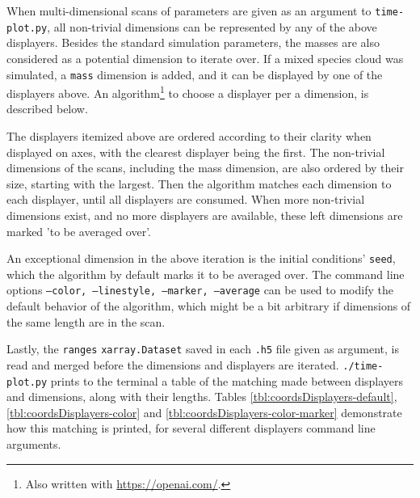 When multi-dimensional scans of parameters are given as an argument to \texttt{time-plot.py}, all non-trivial dimensions can be represented by any of the above displayers. Besides the standard simulation parameters, the masses are also considered as a potential dimension to iterate over. If a mixed species cloud was simulated, a \texttt{mass} dimension is added, and it can be displayed by one of the displayers above. An algorithm\footnote{Also written with \url{https://openai.com/}.} to choose a displayer per a dimension, is described below.

The displayers itemized above are ordered according to their clarity when displayed on axes, with the clearest displayer being the first. The non-trivial dimensions of the scans, including the mass dimension, are also ordered by their size, starting with the largest. Then the algorithm matches each dimension to each displayer, until all displayers are consumed. When more non-trivial dimensions exist, and no more displayers are available, these left dimensions are marked 'to be averaged over'.

An exceptional dimension in the above iteration is the initial conditions' \texttt{seed}, which the algorithm by default marks it to be averaged over. The command line options \texttt{--color, --linestyle, --marker, --average} can be used to modify the default behavior of the algorithm, which might be a bit arbitrary if dimensions of the same length are in the scan.

Lastly, the \texttt{ranges} \texttt{xarray.Dataset} saved in each \texttt{.h5} file given as argument, is read and merged before the dimensions and displayers are iterated. \texttt{./time-plot.py} prints to the terminal a table of the matching made between displayers and dimensions, along with their lengths. Tables \ref{tbl:coordsDisplayers-default}, \ref{tbl:coordsDisplayers-color} and \ref{tbl:coordsDisplayers-color-marker} demonstrate how this matching is printed, for several different displayers command line arguments.

\begin{table}[h]

\caption{The default match made by the plotting scripts between displayers and \texttt{xarray.Dataset} dimensions, for a scan with only 1 mass.}
\label{tbl:coordsDisplayers-default}
\end{table}

\begin{table}[h]

\caption{The dimensions-displayers match for the same \texttt{.h5} files as in \ref{tbl:coordsDisplayers-default}, but when \texttt{--color omega} was given.}
\label{tbl:coordsDisplayers-color}
\end{table}

